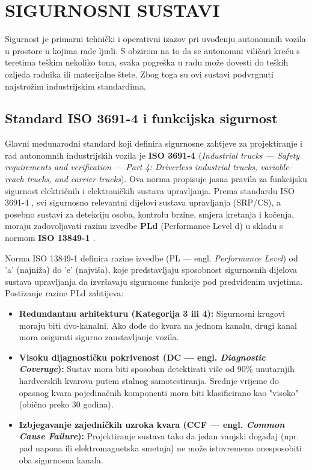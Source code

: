 \section{SIGURNOSNI SUSTAVI}
Sigurnost je primarni tehnički i operativni izazov pri uvođenju autonomnih vozila u prostore u kojima rade ljudi. S obzirom na to da se autonomni viličari kreću s teretima teškim nekoliko tona, svaka pogreška u radu može dovesti do teških ozljeda radnika ili materijalne štete. Zbog toga su ovi sustavi podvrgnuti najstrožim industrijskim standardima.

\subsection{Standard ISO 3691-4 \cite{iso3691} i funkcijska sigurnost}
Glavni međunarodni standard koji definira sigurnosne zahtjeve za projektiranje i rad autonomnih industrijskih vozila je \textbf{ISO 3691-4 \cite{iso3691}} (\textit{Industrial trucks — Safety requirements and verification — Part 4: Driverless industrial trucks, variable-reach trucks, and carrier-trucks}). Ova norma propisuje jasna pravila za funkcijsku sigurnost električnih i elektroničkih sustava upravljanja. Prema standardu ISO 3691-4 \cite{iso3691}, svi sigurnosno relevantni dijelovi sustava upravljanja (SRP/CS), a posebno sustavi za detekciju osoba, kontrolu brzine, smjera kretanja i kočenja, moraju zadovoljavati razinu izvedbe \textbf{PLd} (Performance Level d) u skladu s normom \textbf{ISO 13849-1 \cite{iso13849}}.

Norma ISO 13849-1 \cite{iso13849} definira razine izvedbe (PL — engl. \textit{Performance Level}) od 'a' (najniža) do 'e' (najviša), koje predstavljaju sposobnost sigurnosnih dijelova sustava upravljanja da izvršavaju sigurnosne funkcije pod predviđenim uvjetima. Postizanje razine PLd zahtijeva:
\begin{itemize}
    \item \textbf{Redundantnu arhitekturu (Kategorija 3 ili 4):} Sigurnosni krugovi moraju biti dvo-kanalni. Ako dođe do kvara na jednom kanalu, drugi kanal mora osigurati sigurno zaustavljanje vozila.
    \item \textbf{Visoku dijagnostičku pokrivenost (DC — engl. \textit{Diagnostic Coverage}):} Sustav mora biti sposoban detektirati više od 90\% unutarnjih hardverskih kvarova putem stalnog samotestiranja.
     Srednje vrijeme do opasnog kvara pojedinačnih komponenti mora biti klasificirano kao "visoko" (obično preko 30 godina).
    \item \textbf{Izbjegavanje zajedničkih uzroka kvara (CCF — engl. \textit{Common Cause Failure}):} Projektiranje sustava tako da jedan vanjski događaj (npr. pad napona ili elektromagnetska smetnja) ne može istovremeno onesposobiti oba sigurnosna kanala.
\end{itemize}

